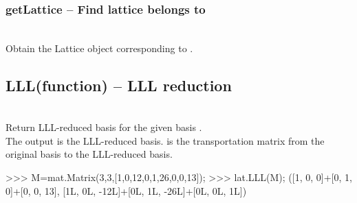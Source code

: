   \subsubsection{getLattice -- Find lattice belongs to}
  \\
  \spacing
  \quad Obtain the Lattice object corresponding to . \\
  \spacing
\C
  \subsection{LLL(function) -- LLL reduction}
   \\
  \spacing
  \quad Return LLL-reduced basis for the given basis . \\
  \spacing
  \quad The output  is the LLL-reduced basis.  is the transportation matrix from the original basis to the LLL-reduced basis.
%
\begin{ex}
>>> M=mat.Matrix(3,3,[1,0,12,0,1,26,0,0,13]);
>>> lat.LLL(M);
([1, 0, 0]+[0, 1, 0]+[0, 0, 13], [1L, 0L, -12L]+[0L, 1L, -26L]+[0L, 0L, 1L])
\end{ex}%
\C



